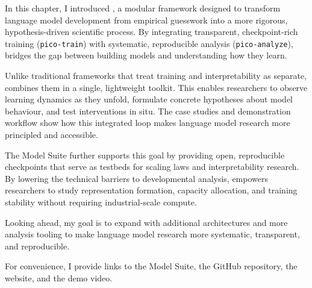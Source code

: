 

In this chapter, I introduced \pico, a modular framework designed to transform language model development from empirical guesswork into a more rigorous, hypothesis-driven scientific process. By integrating transparent, checkpoint-rich training (\texttt{pico-train}) with systematic, reproducible analysis (\texttt{pico-analyze}), \pico bridges the gap between building models and understanding how they learn.

Unlike traditional frameworks that treat training and interpretability as separate, \pico combines them in a single, lightweight toolkit. This enables researchers to observe learning dynamics as they unfold, formulate concrete hypotheses about model behaviour, and test interventions in situ. The case studies and demonstration workflow show how this integrated loop makes language model research more principled and accessible.

The \pico Model Suite further supports this goal by providing open, reproducible checkpoints that serve as testbeds for scaling laws and interpretability research. By lowering the technical barriers to developmental analysis, \pico empowers researchers to study representation formation, capacity allocation, and training stability without requiring industrial-scale compute.

Looking ahead, my goal is to expand \pico with additional architectures and more analysis tooling to make language model research more systematic, transparent, and reproducible.


\vspace{1em}
For convenience, I provide links to the \pico Model Suite, the \pico GitHub repository, the \pico website, and the \pico demo video.

